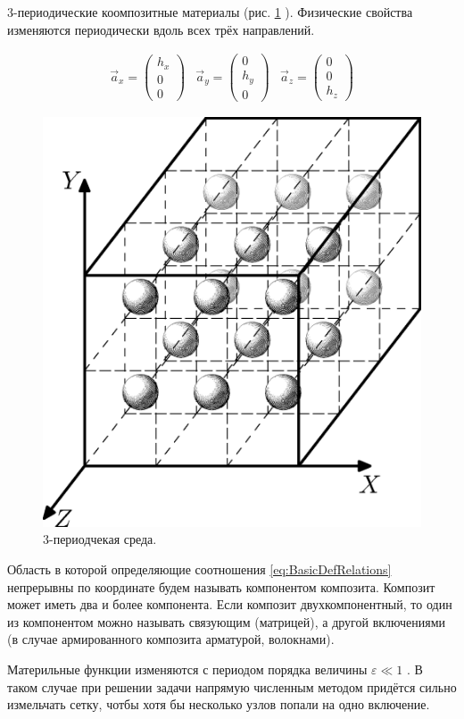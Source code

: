 3-периодические коомпозитные материалы (рис. 
\ref{images:three_period}
).  Физические свойства изменяются периодически вдоль всех трёх направлений.

\begin{equation}
    \begin{array}{ccc}
    \vec{a}_x = \left(\begin{array}{c}h_x\\0\\0\end{array}\right) & 
    \vec{a}_y = \left(\begin{array}{c}0\\h_y\\0\end{array}\right) & 
    \vec{a}_z = \left(\begin{array}{c}0\\0\\h_z\end{array}\right)
    \end{array}
\end{equation}

\begin{figure} [ht] 
    \center
    \includegraphics [scale=0.5] {images/three_period}
    \caption{3-периодчекая среда.} 
    \label{images:three_period}  
\end{figure}

Область в которой определяющие соотношения 
\ref{eq:BasicDefRelations}
непрерывны по координате будем называть компонентом композита.
Композит может иметь два и более компонента. 
Если композит двухкомпонентный, то один из компонентом можно называть связующим (матрицей), а другой включениями (в случае армированного композита арматурой, волокнами).

Материльные функции изменяются с периодом порядка величины
$ \varepsilon \ll 1 $
. В таком случае при решении задачи напрямую численным методом придётся сильно измельчать сетку,
чотбы хотя бы несколько узлов попали на одно включение. 
